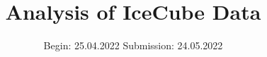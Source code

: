 
\setlength\parindent{0pt}
\subject{Schwerpunktspraktikum Teilchenphysik und Detektoren}
\title{Analysis of IceCube Data}
\date{%
  Begin: 25.04.2022
  \hspace{3em}
  Submission:  24.05.2022
}



\maketitle
\thispagestyle{empty}
\tableofcontents
\newpage








\newpage
\nocite{*}
\printbibliography
\appendix



